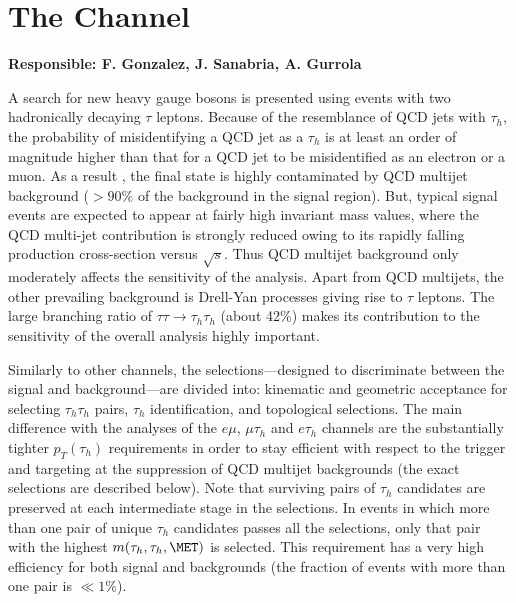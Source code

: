 \section{The \ditauhad Channel}\label{sec:dihad}
\textbf{Responsible: F. Gonzalez, J. Sanabria, A. Gurrola}
\iffalse

A search for new heavy gauge bosons is presented using events with two hadronically decaying $\tau$ leptons. Because of the resemblance of QCD jets with $\tau_{h}$, the probability of misidentifying a QCD jet as a $\tau_{h}$ is at least an order of magnitude higher than that for a QCD jet to be misidentified as an electron or a muon. As a result , the final state is highly contaminated by QCD multijet background ($> 90\%$ of the background in the signal region). But, typical signal events are expected to appear at fairly high invariant mass values, where the QCD multi-jet contribution is strongly reduced owing to its rapidly falling production cross-section versus $\sqrt{s}$. Thus QCD multijet background only moderately affects the sensitivity of the analysis. Apart from QCD multijets, the other prevailing background is Drell-Yan processes giving rise to $\tau$ leptons. The large branching ratio of $\tau\tau \to \tau_{h}\tau_{h}$ (about 42\%) makes its contribution to the sensitivity of the overall analysis highly important.   

Similarly to other channels, the selections---designed to discriminate between the signal and background---are divided into: kinematic and geometric acceptance for selecting $\tau_{h}\tau_{h}$ pairs, $\tau_{h}$ identification, and topological selections. The main difference with the analyses of the $e\mu$, $\mu \tau_h$ and $e \tau_h$ channels are the substantially tighter $p_{T}(\tau_{h})$ requirements in order to stay efficient with respect to the trigger and targeting at the suppression of QCD multijet backgrounds (the exact selections are described below). Note that surviving pairs of $\tau_{h}$ candidates are preserved at each intermediate stage in the selections. In events in which more than one pair of unique $\tau_{h}$ candidates passes all the selections, only that pair with the highest $m(\tau_{h},\tau_{h},\MET)$ is selected. This requirement has a very high efficiency for both signal and backgrounds (the fraction of events with more than one pair is $\ll 1$\%).

